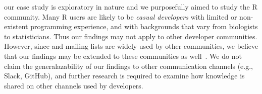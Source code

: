 \begin{description}[itemsep=3pt, topsep=2pt, leftmargin=1em, parsep=0pt]

\item[External validity:] our case study is exploratory in nature and we purposefully aimed to study the R community. Many R users are likely to be \textit{casual developers} with limited or non-existent programming experience, and with backgrounds that vary from biologists to statisticians. Thus our findings may not apply to other developer communities. However, since \SO and mailing lists are widely used by other communities, we believe that our findings may be extended to these communities as well~\cite{Squire2015a}. We do not claim the generalazability of our findings to other communication channels (e.g., Slack, GitHub), and further research is required to examine how knowledge is shared on other channels used by developers.

\end{description}

